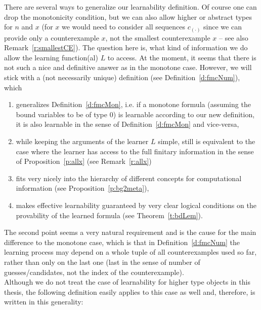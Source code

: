 There are several ways to generalize our learnability definition. 
Of course one can drop the monotonicity condition, but we can also allow higher or abstract types for $n$ and $x$ 
(for $x$ we would need to consider all sequences $c_{(\cdot)}$ since we can provide only a counterexample $x$, 
not the smallest counterexample $x$ -- see also Remark~\ref{r:smallestCE}). 
The question here is, what kind of information we do allow the learning function(al) $L$ to access. At the moment, it seems 
that there is not such a nice and definitive answer as in the monotone case. However, we will stick with a (not necessarily unique) definition (see Definition~\ref{d:fmcNum}), which
\begin{enumerate} 
\item generalizes Definition~\ref{d:fmcMon}, i.e. if a monotone formula (assuming the bound variables to be of type $0$) is learnable according to our new definition, it is also learnable in the sense of 
Definition~\ref{d:fmcMon} and vice-versa,
\item while keeping the arguments of the learner $L$ simple, still is equivalent to the case where the learner has access to the full finitary information in the sense of Proposition~\ref{p:allx} (see Remark~\ref{r:allx})
\item fits very nicely into the hierarchy of different concepts for computational information (see Proposition~\ref{p:bg2meta}),
\item makes effective learnability guaranteed by very clear logical conditions on the provability of the learned formula (see Theorem~\ref{t:bdLem}).
\end{enumerate} 
The second point seems a very natural requirement and is the cause for 
the main difference to the monotone case, which is that in Definition~\ref{d:fmcNum} the learning process may depend on a whole tuple of all counterexamples used so far, rather than only on the 
last one (last in the sense of number of guesses/candidates, not the index of the counterexample). 
\\[1mm] 
Although we do not treat the case of learnability for higher type objects 
in this thesis, the following definition easily applies to this case as well 
and, therefore, is written in this generality:
